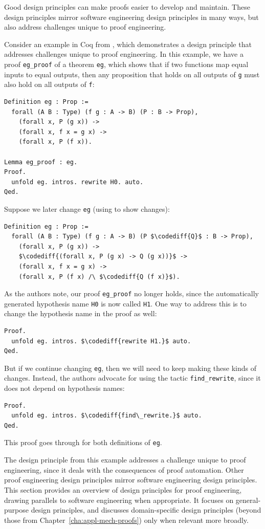 Good design principles can make proofs easier to develop and maintain.
These design principles mirror software engineering design principles
in many ways, but also address challenges unique to proof
engineering.

Consider an example in Coq from \cite{Woos2016},
which demonstrates a design principle that addresses challenges unique to proof engineering.
In this example, we have a proof \lstinline{eg_proof} of a theorem \lstinline{eg},
which shows that if two functions map equal inputs to equal outputs,
then any proposition that holds on all outputs of \lstinline{g}
must also hold on all outputs of \lstinline{f}:
\begin{lstlisting}
Definition eg : Prop :=
  forall (A B : Type) (f g : A -> B) (P : B -> Prop),
    (forall x, P (g x)) ->
    (forall x, f x = g x) ->
    (forall x, P (f x)).

Lemma eg_proof : eg.
Proof.
  unfold eg. intros. rewrite H0. auto.
Qed.
\end{lstlisting}
Suppose we later change \lstinline{eg} (using  to show changes):
\begin{lstlisting}
Definition eg : Prop :=
  forall (A B : Type) (f g : A -> B) (P $\codediff{Q}$ : B -> Prop),
    (forall x, P (g x)) ->
    $\codediff{(forall x, P (g x) -> Q (g x))}$ ->
    (forall x, f x = g x) ->
    (forall x, P (f x) /\ $\codediff{Q (f x)}$).
\end{lstlisting} %
As the authors note, our proof \lstinline{eg_proof} no longer holds,
since the automatically generated hypothesis name \lstinline{H0} is now called \lstinline{H1}.
One way to address this is to change the hypothesis name in the proof as well:
\begin{lstlisting}[language=Coq]
Proof.
  unfold eg. intros. $\codediff{rewrite H1.}$ auto.
Qed.
\end{lstlisting}
But if we continue changing \lstinline{eg}, then we will need to keep making these kinds of changes.
Instead, the authors advocate for using the tactic \lstinline{find_rewrite},
since it does not depend on hypothesis names:
\begin{lstlisting}[language=Coq]
Proof.
  unfold eg. intros. $\codediff{find\_rewrite.}$ auto.
Qed.
\end{lstlisting}
This proof goes through for both definitions of \lstinline{eg}.

The design principle from this example addresses a challenge unique to proof engineering, since it deals with the consequences of proof automation.
Other proof engineering design principles mirror software engineering design principles.
This section provides an overview of design principles for proof engineering, drawing
parallels to software engineering when appropriate.
It focuses on general-purpose design principles, and discusses domain-specific design principles (beyond those from Chapter~\ref{cha:appl-mech-proofs})
only when relevant more broadly.

